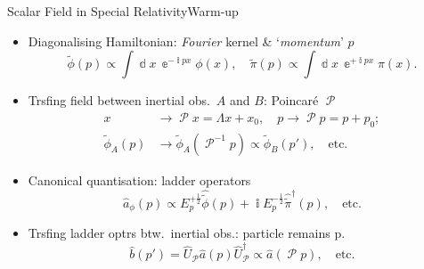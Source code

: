 \documentclass{beamer}
\newcommand{\ii}{{\Bbbi}}
\newcommand{\ee}{{\Bbbe}}
\newcommand{\rfun}[2]{{#1}\mathopen{}\left(#2\right)\mathclose{}}
\newcommand{\dif}{\Bbbd}
\newcommand{\what}[1]{{\widehat{#1}}}
\begin{document}
\begin{frame}{Scalar Field in Special Relativity}{Warm-up}
\begin{itemize}
\item Diagonalising Hamiltonian: \emph{Fourier} kernel \& `\emph{momentum}' $p$
\[
\rfun{\tilde{\phi}}{p} \propto \int \dif x\,\ee^{-\ii p x} \rfun{\phi}{x},
\quad
\rfun{\tilde{\pi}}{p} \propto \int \dif x\,\ee^{+\ii p x} \rfun{\pi}{x}.
\]
\item Trsfing field between inertial obs.\ $A$ and $B$: Poincaré $\mscrP$
\begin{align*}
x &\to \mscrP x = \Lambda x + x_0,\quad p \to \mscrP p = p+p_0;
\\
\rfun{\tilde{\phi}_A}{p} &\to \rfun{\tilde{\phi}_A}{\mscrP^{-1}p}
\propto \rfun{\tilde{\phi}_B}{p'},\quad\text{etc.}
\end{align*}
\item Canonical quantisation: ladder operators
\[ \rfun{\what{a}_\phi}{p} \propto
E_p^{+\frac{1}{2}}\rfun{\what{\tilde{\phi}}}{p}
+ \ii E_p^{-\frac{1}{2}}\rfun{\what{\tilde{\pi}}^\dagger}{p},
\quad \text{etc.}\]
\item Trsfing ladder optrs btw.\ inertial obs.: particle \alert{remains}
p.\
\[
\rfun{\what{b}}{p'}
= \what{U}_\mscrP\rfun{\what{a}}{p}\what{U}^\dagger_\mscrP
\propto \rfun{\what{a}}{\mscrP p},\quad\text{etc.}
\]
\end{itemize}
\end{frame}
\end{document}
